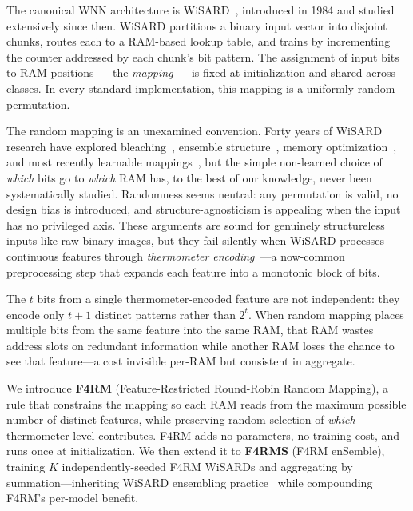\documentclass[runningheads]{llncs}
\begin{document}
The canonical WNN architecture is WiSARD~\cite{aleksander1984wisard}, introduced in 1984 and studied extensively since then. WiSARD partitions a binary input vector into disjoint chunks, routes each to a RAM-based lookup table, and trains by incrementing the counter addressed by each chunk's bit pattern. The assignment of input bits to RAM positions --- the \emph{mapping} --- is fixed at initialization and shared across classes. In every standard implementation, this mapping is a uniformly random permutation.

The random mapping is an unexamined convention. Forty years of WiSARD research have explored bleaching~\cite{grieco2010producing}, ensemble structure~\cite{susskind2023uleen}, memory optimization~\cite{santiago2020bloom,bacellar2022logicwisard}, and most recently learnable mappings~\cite{bacellar2024dwn}, but the simple non-learned choice of \emph{which} bits go to \emph{which} RAM has, to the best of our knowledge, never been systematically studied. Randomness seems neutral: any permutation is valid, no design bias is introduced, and structure-agnosticism is appealing when the input has no privileged axis. These arguments are sound for genuinely structureless inputs like raw binary images, but they fail silently when WiSARD processes continuous features through \emph{thermometer encoding}~\cite{lima2020distributive}---a now-common preprocessing step that expands each feature into a monotonic block of bits.

The $t$ bits from a single thermometer-encoded feature are not independent: they encode only $t+1$ distinct patterns rather than $2^t$. When random mapping places multiple bits from the same feature into the same RAM, that RAM wastes address slots on redundant information while another RAM loses the chance to see that feature---a cost invisible per-RAM but consistent in aggregate.

We introduce \textbf{F4RM} (Feature-Restricted Round-Robin Random Mapping), a rule that constrains the mapping so each RAM reads from the maximum possible number of distinct features, while preserving random selection of \emph{which} thermometer level contributes. F4RM adds no parameters, no training cost, and runs once at initialization. We then extend it to \textbf{F4RMS} (F4RM enSemble), training $K$ independently-seeded F4RM WiSARDs and aggregating by summation---inheriting WiSARD ensembling practice~\cite{susskind2023uleen} while compounding F4RM's per-model benefit.
\end{document}
